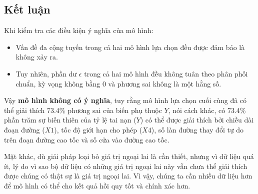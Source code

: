 \subsection*{Kết luận}

Khi kiểm tra các điều kiện ý nghĩa của mô hình:
\begin{itemize}
	\item Vấn đề đa cộng tuyến trong cả hai mô hình lựa chọn đều được đảm bảo là không xảy ra.
	\item Tuy nhiên, phần dư $\epsilon$ trong cả hai mô hình đều không tuân theo phân phối chuẩn, kỳ vọng không bằng 0 và phương sai không là một hằng số.
\end{itemize}

Vậy \textbf{mô hình không có ý nghĩa}, tuy rằng mô hình lựa chọn cuối cùng đã có thể giải thích 73.4\% phương sai của biến phụ thuộc $Y$, nói cách khác, có 73.4\% phần trăm sự biến thiên của tỷ lệ tai nạn ($Y$) có thể được giải thích bởi chiều dài đoạn đường ($X1$), tốc độ giới hạn cho phép ($X4$), số làn đường thay đổi tự do trên đoạn đường cao tốc và số cửa vào đường cao tốc.

Mặt khác, dù giải pháp loại bỏ giá trị ngoại lai là cần thiết, nhưng vì dữ liệu quá ít, lý do vì sao bộ dữ liệu có những giá trị ngoại lai này vẫn chưa thể giải thích được chúng có thật sự là giá trị ngoại lai. Vì vậy, chúng ta cần nhiều dữ liệu hơn để mô hình có thể cho kết quả hồi quy tốt và chính xác hơn.